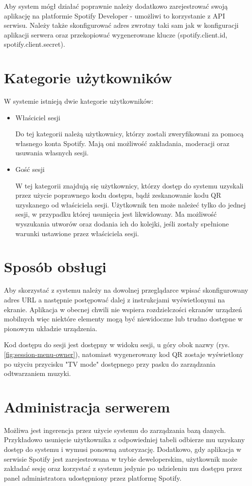 Aby system mógł działać poprawnie należy dodatkowo zarejestrować swoją aplikację na platformie Spotify Developer \cite{bib:spotify_api} - umożliwi to korzystanie z API serwisu. Należy także skonfigurować adres zwrotny taki sam jak w konfiguracji aplikacji serwera oraz przekopiować wygenerowane klucze (spotify.client.id, spotify.client.secret).

\section{Kategorie użytkowników}
W systemie istnieją dwie kategorie użytkowników:
\begin{itemize}
\item Właściciel sesji

Do tej kategorii należą użytkownicy, którzy zostali zweryfikowani za pomocą własnego konta Spotify. Mają oni możliwość zakładania, moderacji oraz usuwania własnych sesji.

\item Gość sesji

W tej kategorii znajdują się użytkownicy, którzy dostęp do systemu uzyskali przez użycie poprawnego kodu dostępu, bądź zeskanowanie kodu QR uzyskanego od właściciela sesji. Użytkownik ten może należeć tylko do jednej sesji, w przypadku której usunięcia jest likwidowany. Ma możliwość wyszukania utworów oraz dodania ich do kolejki, jeśli zostały spełnione warunki ustawione przez właściciela sesji.

\end{itemize}
\section{Sposób obsługi}
Aby skorzystać z systemu należy na dowolnej przeglądarce wpisać skonfigurowany adres URL a następnie postępować dalej z instrukcjami wyświetlonymi na ekranie. Aplikacja w obecnej chwili nie wspiera rozdzielczości ekranów urządzeń mobilnych więc niektóre elementy mogą być niewidoczne lub trudno dostępne w pionowym układzie urządzenia.

Kod dostępu do sesji jest dostępny w widoku sesji, u góry obok nazwy (rys. \ref{fig:session-menu-owner}), natomiast wygenerowany kod QR zostaje wyświetlony po użyciu przycisku "TV mode" dostępnego przy pasku do zarządzania odtwarzaniem muzyki.

\section{Administracja serwerem}
Możliwa jest ingerencja przez użycie systemu do zarządzania bazą danych. Przykładowo usunięcie użytkownika z odpowiedniej tabeli odbierze mu uzyskany dostęp do systemu i wymusi ponowną autoryzację. Dodatkowo, gdy aplikacja w serwisie Spotify jest zarejestrowana w trybie deweloperskim, użytkownik może zakładać sesję oraz korzystać z systemu jedynie po udzieleniu mu dostępu przez panel administratora udostępniony przez platformę Spotify.

